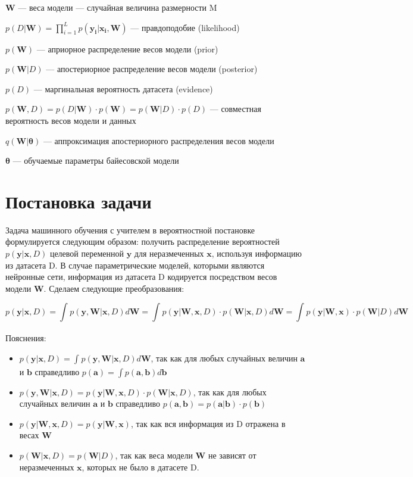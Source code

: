 \documentclass{article}
\begin{document}
$\mathbf{W}$ --- веса модели --- случайная величина размерности M

$p(D | \mathbf{W}) = \prod_{i=1}^{L} p(\mathbf{y_i} | \mathbf{x_i}, \mathbf{W})$ — правдоподобие (likelihood)

$p(\mathbf{W})$ --- априорное распределение весов модели (prior)

$p(\mathbf{W}| D)$ --- апостериорное распределение весов модели (posterior)

$p(D)$ --- маргинальная вероятность датасета (evidence)

$p(\mathbf{W}, D) =
p(D | \mathbf{W}) \cdot p(\mathbf{W}) =
p(\mathbf{W}| D)\cdot p(D)$
--- совместная вероятность весов модели и данных

$q(\mathbf{W} | \pmb{\theta})$ --- аппроксимация апостериорного распределения весов модели

$\pmb{\theta}$ --- обучаемые параметры байесовской модели

\section{Постановка задачи}

Задача машинного обучения с учителем в вероятностной постановке формулируется следующим образом:
получить распределение вероятностей $p(\mathbf{y} | \mathbf{x}, D)$ целевой переменной $\mathbf{y}$
для неразмеченных $\mathbf{x}$, используя информацию из датасета D. В случае параметрические моделей, которыми являются нейронные сети,
информация из датасета D кодируется посредством весов модели $\mathbf{W}$. Сделаем следующие преобразования:

\[
p(\mathbf{y} | \mathbf{x}, D) =
\int_{}{} p(\mathbf{y}, \mathbf{W} | \mathbf{x}, D) d\mathbf{W} =
\int_{}{} p(\mathbf{y} | \mathbf{W}, \mathbf{x}, D) \cdot p(\mathbf{W} | \mathbf{x}, D) d\mathbf{W} =
\int_{}{} p(\mathbf{y} | \mathbf{W}, \mathbf{x}) \cdot p(\mathbf{W} | D) d\mathbf{W}
\]

Пояснения:
\begin{itemize}
 \item $p(\mathbf{y} | \mathbf{x}, D) = \int_{}{} p(\mathbf{y}, \mathbf{W} | \mathbf{x}, D) d\mathbf{W}$,
 так как для любых случайных величин $\mathbf{a}$ и $\mathbf{b}$ справедливо $p(\mathbf{a}) = \int p(\mathbf{a}, \mathbf{b}) d\mathbf{b}$
 \item $p(\mathbf{y}, \mathbf{W} | \mathbf{x}, D) = p(\mathbf{y} | \mathbf{W}, \mathbf{x}, D) \cdot p(\mathbf{W} | \mathbf{x}, D)$,
 так как для любых случайных величин $\mathbf{a}$ и $\mathbf{b}$ справедливо $p(\mathbf{a}, \mathbf{b}) = p(\mathbf{a}| \mathbf{b}) \cdot p(\mathbf{b})$
 \item $p(\mathbf{y} | \mathbf{W}, \mathbf{x}, D) = p(\mathbf{y} | \mathbf{W}, \mathbf{x})$, так как вся информация из D отражена в весах $\mathbf{W}$
 \item $p(\mathbf{W} | \mathbf{x}, D) = p(\mathbf{W} | D)$, так как веса модели $\mathbf{W}$ не зависят от неразмеченных $\mathbf{x}$, которых не было в датасете D.
\end{itemize}
\end{document}
